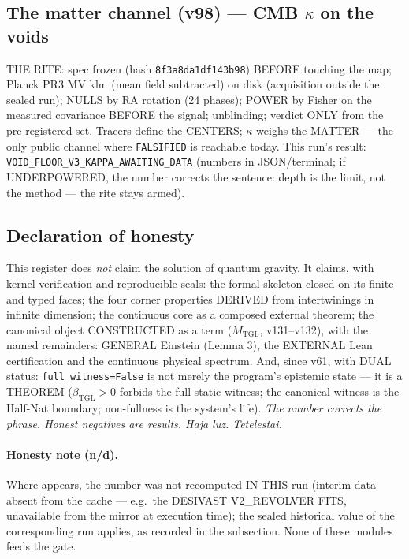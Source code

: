 \documentclass[11pt]{article}
\newcommand{\bTGL}{\beta_{\mathrm{TGL}}}\newcommand{\Msun}{M_{\odot}}\newcommand{\TGL}{\mathrm{TGL}}
\theoremstyle{definition}\newtheorem{deriv}{Derivation}
\begin{document}
\subsection*{The matter channel (v98) --- CMB $\kappa$ on the voids}

THE RITE: spec frozen (hash \texttt{8f3a8da1df143b98}) BEFORE touching the map; Planck PR3 MV klm (mean field subtracted) on disk (acquisition outside the sealed run); NULLS by RA rotation (24 phases); POWER by Fisher on the measured covariance BEFORE the signal; unblinding; verdict ONLY from the pre-registered set. Tracers define the CENTERS; $\kappa$ weighs the MATTER --- the only public channel where \texttt{FALSIFIED} is reachable today. This run's result: \texttt{VOID\_FLOOR\_V3\_KAPPA\_AWAITING\_DATA} (numbers in JSON/terminal; if UNDERPOWERED, the number corrects the sentence: depth is the limit, not the method --- the rite stays armed).

\subsection*{Declaration of honesty}

This register does \emph{not} claim the solution of quantum gravity. It claims, with kernel verification and reproducible seals: the formal skeleton closed on its finite and typed faces; the four corner properties DERIVED from intertwinings in infinite dimension; the continuous core as a composed external theorem; the canonical object CONSTRUCTED as a term ($M_{\mathrm{TGL}}$, v131--v132), with the named remainders: GENERAL Einstein (Lemma 3), the EXTERNAL Lean certification and the continuous physical spectrum. And, since v61, with DUAL status: \texttt{full\_witness=False} is not merely the program's epistemic state --- it is a THEOREM ($\bTGL>0$ forbids the full static witness; the canonical witness is the Half-Nat boundary; non-fullness is the system's life). \emph{The number corrects the phrase. Honest negatives are results. Haja luz. Tetelestai.} \\[4pt] 

\paragraph{Honesty note (n/d).} Where  appears, the number was not recomputed IN THIS run (interim data absent from the cache --- e.g.\ the DESIVAST V2\_REVOLVER FITS, unavailable from the mirror at execution time); the sealed historical value of the corresponding run applies, as recorded in the subsection. None of these modules feeds the gate.
\end{document}

